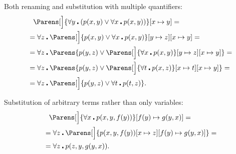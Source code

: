 \begin{example}
\begin{ExEnum}
     Both renaming and substitution with multiple quantifiers:
    \begin{align*}
      &{}\phantom{=}{}
      \Parens[\Big]{ \forall y \centerdot (p(x, y) \vee \forall x \centerdot p(x, y)) }[x \mapsto y]
      = \\ &=
      \forall z \centerdot \Parens[\Big]{ p(x, y) \vee \forall x \centerdot p(x, y) }[y \mapsto z][x \mapsto y]
      = \\ &=
      \forall z \centerdot \Parens{ p(y, z) \vee \Parens[\Big]{ \forall x \centerdot p(x, y) }[y \mapsto z][x \mapsto y] }
      = \\ &=
      \forall z \centerdot \Parens{ p(y, z) \vee \Parens[\Big]{ \forall t \centerdot p(x, z) }[x \mapsto t][x \mapsto y] }
      = \\ &=
      \forall z \centerdot \Parens[\Big]{ p(y, z) \vee \forall t \centerdot p(t, z) }.
    \end{align*}

     Substitution of arbitrary terms rather than only variables:
    \begin{align*}
      &{}\phantom{=}{}
      \Parens[\Big]{\forall x \centerdot p(x, y, f(y))}[f(y) \mapsto g(y, x)]
      = \\ &=
      \forall z \centerdot \Parens[\Big]{p(x, y, f(y))[x \mapsto z][f(y) \mapsto g(y, x)]}
      = \\ &=
      \forall z \centerdot p(z, y, g(y, x)).
    \end{align*}
  \end{ExEnum}
\end{example}
